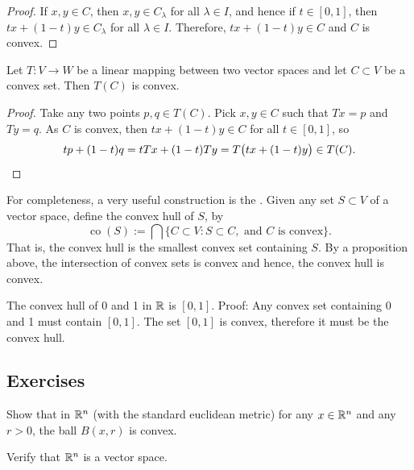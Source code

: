 \begin{proof}
If $x, y \in C$, then $x,y \in C_\lambda$ for all
$\lambda \in I$, and hence if $t \in [0,1]$, then $tx + (1-t)y \in
C_\lambda$ for all $\lambda \in I$.  Therefore, $tx + (1-t)y \in C$ and $C$
is convex.
\end{proof}

\begin{prop}
Let $T \colon V \to W$ be a linear mapping between two vector spaces and
let $C \subset V$ be a convex set.  Then $T(C)$ is convex.
\end{prop}

\begin{proof}
Take any two points $p,q \in T(C)$.  Pick $x,y \in C$ such that
$Tx = p$ and $Ty=q$.  As $C$ is convex, then
$tx+(1-t)y \in C$
for all $t \in [0,1]$, so
\begin{equation*}
tp+(1-t)q 
=
tTx+(1-t)Ty
=
T\bigl(tx+(1-t)y\bigr)
\in T(C) .  \qedhere
\end{equation*}
\end{proof}

For completeness, a very useful construction is the
\emph{}.  Given any set $S \subset V$ of a vector
space, define the convex hull of $S$, by
\begin{equation*}
\operatorname{co}(S) :=
\bigcap \{ C \subset V : S \subset C, \text{ and $C$ is convex} \} .
\end{equation*}
That is, the convex hull is the smallest convex set containing $S$.  
By a proposition above, the intersection of convex sets is convex and
hence, the convex hull is convex.

\begin{example}
The convex hull of 0 and 1 in ${\mathbb{R}}$ is $[0,1]$.  Proof:
Any convex set containing 0 and 1 must contain $[0,1]$.  The set $[0,1]$
is convex, therefore it must be the convex hull.
\end{example}

\subsection{Exercises}

\begin{exercise}
Show that in ${\mathbb{R}}^n$
(with the standard euclidean metric)
for any $x \in {\mathbb{R}}^n$ and any $r > 0$,
the ball $B(x,r)$ is
convex.
\end{exercise}


\begin{exercise}
Verify that ${\mathbb{R}}^n$ is a vector space.
\end{exercise}

